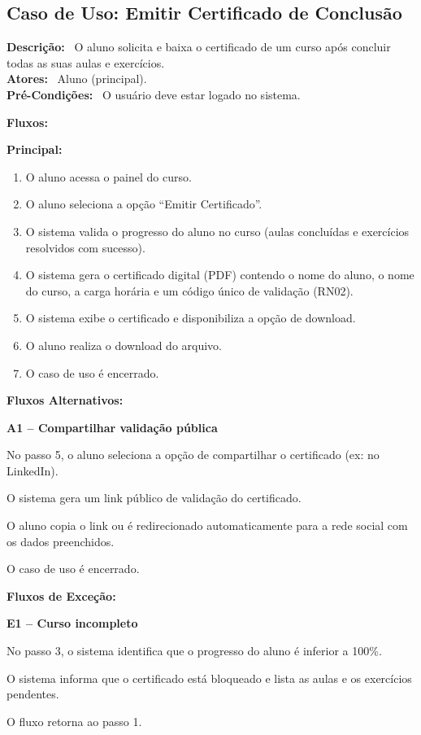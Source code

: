 \documentclass[11pt,a4paper]{article}
\newcommand{\casodeuso}[1]{\subsection{Caso de Uso: #1}}
\newcommand{\campo}[1]{\textbf{#1:}~}
\newcommand{\fluxotitulo}[1]{\par\needspace{8\baselineskip}\medskip\hspace*{1.5em}\textbf{#1}\par\nopagebreak}
\newcommand{\subfluxo}[1]{\par\needspace{4\baselineskip}\smallskip\hspace*{1.5em}\textbf{#1}\par\nopagebreak}
\newenvironment{principal}
  {\begin{enumerate}[leftmargin=4.5em,itemsep=0pt,topsep=2pt]}
  {\end{enumerate}}
\newenvironment{passos}
  {\begin{description}[leftmargin=4.5em,labelindent=3em,itemsep=0pt,topsep=2pt,
     font=\normalfont\bfseries,style=sameline]}
  {\end{description}}
\newcommand{\passo}[1]{\item[#1 -]}
\begin{document}
  \casodeuso{Emitir Certificado de Conclusão}

  \campo{Descrição} O aluno solicita e baixa o certificado de um curso após
  concluir todas as suas aulas e exercícios.\\
  \campo{Atores} Aluno (principal).\\
  \campo{Pré-Condições} O usuário deve estar logado no sistema.

  \campo{Fluxos}

  \fluxotitulo{Principal:}
  \begin{principal}
    \item O aluno acessa o painel do curso.
    \item O aluno seleciona a opção ``Emitir Certificado''.
    \item O sistema valida o progresso do aluno no curso (aulas concluídas e
    exercícios resolvidos com sucesso).
    \item O sistema gera o certificado digital (PDF) contendo o nome do aluno, o
    nome do curso, a carga horária e um código único de validação (RN02).
    \item O sistema exibe o certificado e disponibiliza a opção de download.
    \item O aluno realiza o download do arquivo.
    \item O caso de uso é encerrado.
  \end{principal}

  \fluxotitulo{Fluxos Alternativos:}

  \subfluxo{A1 -- Compartilhar validação pública}
  \begin{passos}
    \passo{A1.1} No passo 5, o aluno seleciona a opção de compartilhar o
    certificado (ex: no LinkedIn).
    \passo{A1.2} O sistema gera um link público de validação do certificado.
    \passo{A1.3} O aluno copia o link ou é redirecionado automaticamente para a
    rede social com os dados preenchidos.
    \passo{A1.4} O caso de uso é encerrado.
  \end{passos}

  \fluxotitulo{Fluxos de Exceção:}

  \subfluxo{E1 -- Curso incompleto}
  \begin{passos}
    \passo{E1.1} No passo 3, o sistema identifica que o progresso do aluno é
    inferior a 100\%.
    \passo{E1.2} O sistema informa que o certificado está bloqueado e lista as
    aulas e os exercícios pendentes.
    \passo{E1.3} O fluxo retorna ao passo 1.
  \end{passos}
\end{document}
